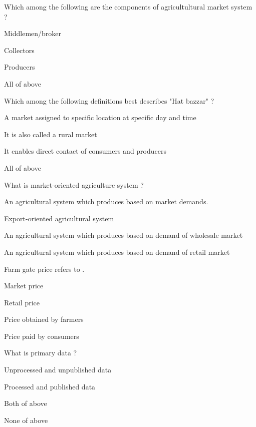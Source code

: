 \begin{questions}
\question Which among the following are the components of agricultultural market system ?
  \begin{items}
  \item Middlemen/broker
  \item Collectors
  \item Producers
  \item* All of above
  \end{items}

\question Which among the following definitions best describes "Hat bazzar" ?
  \begin{items}
  \item A market assigned to specific location at specific day and time
  \item It is also called a rural market
  \item It enables direct contact of consumers and producers
  \item* All of above
  \end{items}

\question What is market-oriented agriculture system ?
  \begin{items}
  \item* An agricultural system which produces based on market demands.
  \item Export-oriented agricultural system
  \item An agricultural system which produces based on demand of wholesale market
  \item An agricultural system which produces based on demand of retail market
  \end{items}

\question Farm gate price refers to \fillin[][3cm].
  \begin{items}
  \item Market price
  \item Retail price
  \item* Price obtained by farmers
  \item Price paid by consumers
  \end{items}

\question What is primary data ?
\begin{items}
\item* Unprocessed and unpublished data
\item Processed and published data
\item Both of above
\item None of above
\end{items}


\end{questions}
